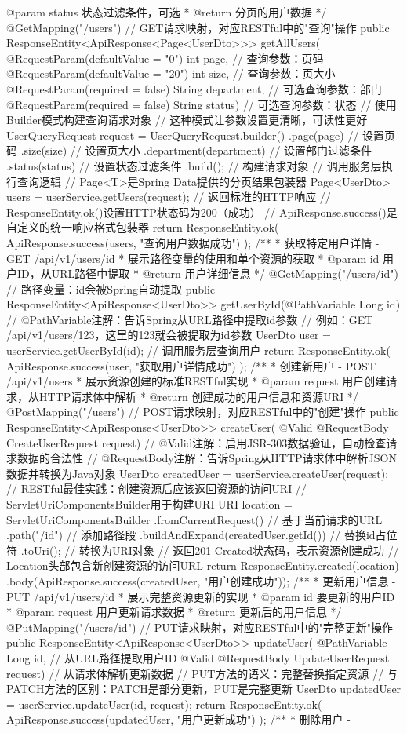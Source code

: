 {{{{{@param status 状态过滤条件，可选 * @return 分页的用户数据 */ @GetMapping("/users") // GET请求映射，对应RESTful中的"查询"操作 public ResponseEntity<ApiResponse<Page<UserDto>>> getAllUsers( @RequestParam(defaultValue = "0") int page, // 查询参数：页码 @RequestParam(defaultValue = "20") int size, // 查询参数：页大小 @RequestParam(required = false) String department, // 可选查询参数：部门 @RequestParam(required = false) String status) { // 可选查询参数：状态 // 使用Builder模式构建查询请求对象 // 这种模式让参数设置更清晰，可读性更好 UserQueryRequest request = UserQueryRequest.builder() .page(page) // 设置页码 .size(size) // 设置页大小 .department(department) // 设置部门过滤条件 .status(status) // 设置状态过滤条件 .build(); // 构建请求对象 // 调用服务层执行查询逻辑 // Page<T>是Spring Data提供的分页结果包装器 Page<UserDto> users = userService.getUsers(request); // 返回标准的HTTP响应 // ResponseEntity.ok()设置HTTP状态码为200（成功） // ApiResponse.success()是自定义的统一响应格式包装器 return ResponseEntity.ok( ApiResponse.success(users, "查询用户数据成功") ); } /** * 获取特定用户详情 - GET /api/v1/users/{id} * 展示路径变量的使用和单个资源的获取 * @param id 用户ID，从URL路径中提取 * @return 用户详细信息 */ @GetMapping("/users/{id}") // 路径变量：{id}会被Spring自动提取 public ResponseEntity<ApiResponse<UserDto>> getUserById(@PathVariable Long id) { // @PathVariable注解：告诉Spring从URL路径中提取id参数 // 例如：GET /api/v1/users/123，这里的123就会被提取为id参数 UserDto user = userService.getUserById(id); // 调用服务层查询用户 return ResponseEntity.ok( ApiResponse.success(user, "获取用户详情成功") ); } /** * 创建新用户 - POST /api/v1/users * 展示资源创建的标准RESTful实现 * @param request 用户创建请求，从HTTP请求体中解析 * @return 创建成功的用户信息和资源URI */ @PostMapping("/users") // POST请求映射，对应RESTful中的"创建"操作 public ResponseEntity<ApiResponse<UserDto>> createUser( @Valid @RequestBody CreateUserRequest request) { // @Valid注解：启用JSR-303数据验证，自动检查请求数据的合法性 // @RequestBody注解：告诉Spring从HTTP请求体中解析JSON数据并转换为Java对象 UserDto createdUser = userService.createUser(request); // RESTful最佳实践：创建资源后应该返回资源的访问URI // ServletUriComponentsBuilder用于构建URI URI location = ServletUriComponentsBuilder .fromCurrentRequest() // 基于当前请求的URL .path("/{id}") // 添加路径段 .buildAndExpand(createdUser.getId()) // 替换{id}占位符 .toUri(); // 转换为URI对象 // 返回201 Created状态码，表示资源创建成功 // Location头部包含新创建资源的访问URL return ResponseEntity.created(location) .body(ApiResponse.success(createdUser, "用户创建成功")); } /** * 更新用户信息 - PUT /api/v1/users/{id} * 展示完整资源更新的实现 * @param id 要更新的用户ID * @param request 用户更新请求数据 * @return 更新后的用户信息 */ @PutMapping("/users/{id}") // PUT请求映射，对应RESTful中的"完整更新"操作 public ResponseEntity<ApiResponse<UserDto>> updateUser( @PathVariable Long id, // 从URL路径提取用户ID @Valid @RequestBody UpdateUserRequest request) { // 从请求体解析更新数据 // PUT方法的语义：完整替换指定资源 // 与PATCH方法的区别：PATCH是部分更新，PUT是完整更新 UserDto updatedUser = userService.updateUser(id, request); return ResponseEntity.ok( ApiResponse.success(updatedUser, "用户更新成功") ); } /** * 删除用户 - }}}}}

